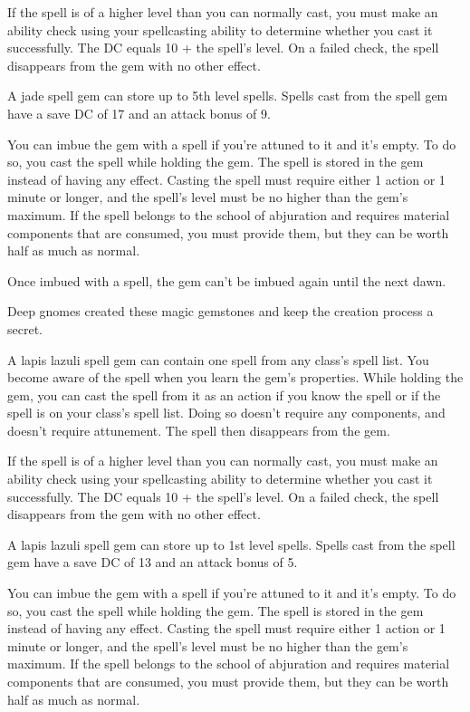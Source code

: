 \documentclass[10pt,a4paper,twoside,bg=print,twocolumn,openany,nodeprecatedcode]{dndbook}
\begin{document}
If the spell is of a higher level than you can normally cast, you must make an ability check using your spellcasting ability to determine whether you cast it successfully. The DC equals 10 + the spell's level. On a failed check, the spell disappears from the gem with no other effect.

A jade spell gem can store up to 5th level spells. Spells cast from the spell gem have a save DC of 17 and an attack bonus of 9.

You can imbue the gem with a spell if you're attuned to it and it's empty. To do so, you cast the spell while holding the gem. The spell is stored in the gem instead of having any effect. Casting the spell must require either 1 action or 1 minute or longer, and the spell's level must be no higher than the gem's maximum. If the spell belongs to the school of abjuration and requires material components that are consumed, you must provide them, but they can be worth half as much as normal.

Once imbued with a spell, the gem can't be imbued again until the next dawn.

Deep gnomes created these magic gemstones and keep the creation process a secret.

A lapis lazuli spell gem can contain one spell from any class's spell list. You become aware of the spell when you learn the gem's properties. While holding the gem, you can cast the spell from it as an action if you know the spell or if the spell is on your class's spell list. Doing so doesn't require any components, and doesn't require attunement. The spell then disappears from the gem.

If the spell is of a higher level than you can normally cast, you must make an ability check using your spellcasting ability to determine whether you cast it successfully. The DC equals 10 + the spell's level. On a failed check, the spell disappears from the gem with no other effect.

A lapis lazuli spell gem can store up to 1st level spells. Spells cast from the spell gem have a save DC of 13 and an attack bonus of 5.

You can imbue the gem with a spell if you're attuned to it and it's empty. To do so, you cast the spell while holding the gem. The spell is stored in the gem instead of having any effect. Casting the spell must require either 1 action or 1 minute or longer, and the spell's level must be no higher than the gem's maximum. If the spell belongs to the school of abjuration and requires material components that are consumed, you must provide them, but they can be worth half as much as normal.
\end{document}
